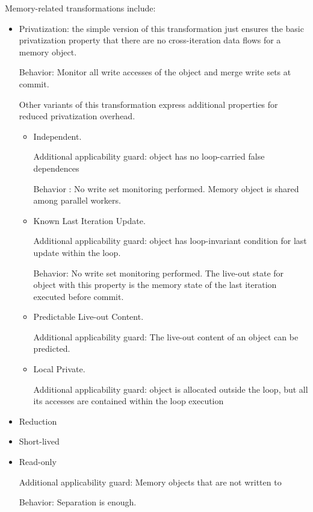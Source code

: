 
Memory-related transformations include:
%
\begin{itemize}
%
\item Privatization: the simple version of this transformation just
ensures the basic privatization property that there are no
cross-iteration data flows for a memory object.

Behavior: Monitor all write accesses of the object and merge write
sets at commit.

Other variants of this transformation express additional properties for
reduced privatization overhead.
%
\begin{itemize}
%
\item Independent.

Additional applicability guard: object has no
loop-carried false dependences

Behavior : No write set monitoring performed. Memory object is shared among parallel workers.
%
%
\item Known Last Iteration Update.

Additional applicability guard:
object has loop-invariant condition for last update within the loop.

Behavior: No write set monitoring performed. The live-out state for
object with this property is the memory state of the last iteration
executed before commit.
%
%
\item Predictable Live-out Content.

Additional applicability guard:
The live-out content of an object can be predicted.
%
%
\item Local Private.

Additional applicability guard: object is
allocated outside the loop, but all its accesses are contained within
the loop execution
%
\end{itemize}

\item Reduction

\item Short-lived

\item Read-only

Additional applicability guard: Memory objects that are not written to

Behavior: Separation is enough.

\end{itemize}

